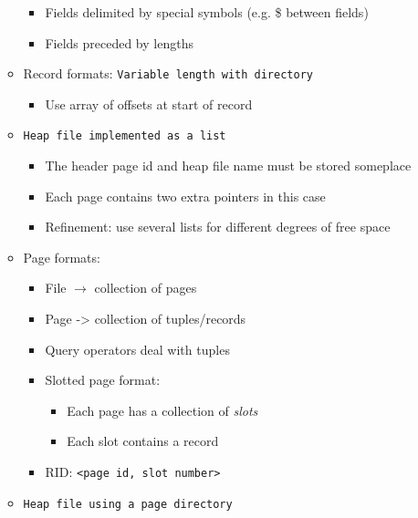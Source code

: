 \documentclass[landscape,8pt]{extarticle}
\newcommand{\code}{\lstinline}
\begin{document}
\begin{multicols}{4}
\begin{itemize}
\begin{itemize}
\begin{itemize}
                            \item Fields delimited by special symbols (e.g. \$ between fields)
                            \item Fields preceded by lengths
                        \end{itemize}
                  \item  Record formats: \code{Variable length with directory}
                        \begin{itemize}
                            \item Use array of offsets at start of record
                        \end{itemize}
                  \item \code{Heap file implemented as a list}
                        \begin{itemize}
                            \item The header page id and heap file name must be stored someplace
                            \item Each page contains two extra pointers in this case
                            \item Refinement: use several lists for different degrees of free space
                        \end{itemize}
                  \item Page formats:
                        \begin{itemize}
                            \item File $\rightarrow$ collection of pages
                            \item Page -> collection of tuples/records
                            \item Query operators deal with tuples
                            \item Slotted page format:
                                  \begin{itemize}
                                      \item Each page has a collection of \emph{slots}
                                      \item Each slot contains a record
                                  \end{itemize}
                            \item RID: \code{<page id, slot number>}
                        \end{itemize}
                  \item \code{Heap file using a page directory}

\end{itemize}
\end{itemize}
\end{multicols}
\end{document}
